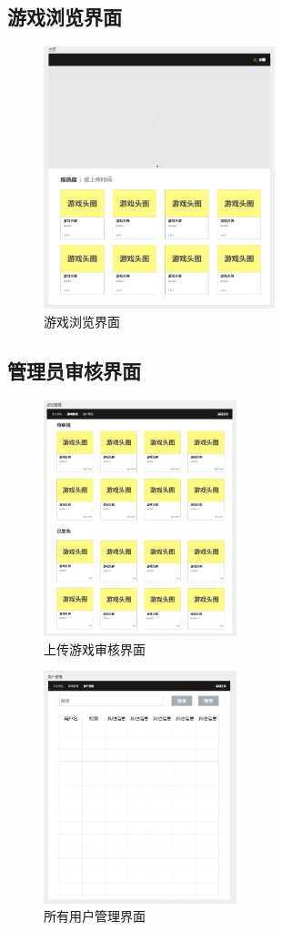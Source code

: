 \documentclass[12pt]{ctexart} %
\begin{document}
\subsection{游戏浏览界面}

\begin{figure}[H]
  \centering
  \includegraphics[width=0.6\textwidth]{main.jpg}
  \caption{游戏浏览界面}
\end{figure}

\subsection{管理员审核界面}

\begin{figure}[H]
  \centering
  \includegraphics[width=0.5\textwidth]{admin_game.jpg}
  \caption{上传游戏审核界面}
\end{figure}

\begin{figure}[H]
  \centering
  \includegraphics[width=0.5\textwidth]{admin_user.jpg}
  \caption{所有用户管理界面}
\end{figure}
\end{document}
